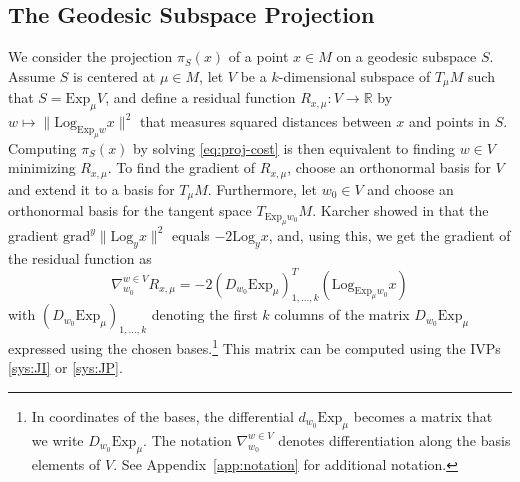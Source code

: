 \documentclass[final]{svjour3}
\newcommand{\RR}{\mathbb{R}}
\newcommand{\grad}{\mathrm{grad}}
\newcommand{\Exp}{\mathrm{Exp}}
\newcommand{\Log}{\mathrm{Log}}
\begin{document}
\subsection{The Geodesic Subspace Projection}
We consider the projection $\pi_S(x)$ of a point $x\in
M$ on a geodesic subspace $S$. Assume $S$ is centered at $\mu\in M$, 
let $V$ be a $k$-dimensional subspace of $T_\mu M$
such that $S=\Exp_\mu V$, and define a residual function $R_{x,\mu}:V\rightarrow\RR$ 
by $w\mapsto\|\Log_{\Exp_\mu w}x\|^2$ that measures squared distances between $x$ and points
in $S$. Computing $\pi_S(x)$ by solving \eqref{eq:proj-cost} is then equivalent to
finding $w\in V$ minimizing $R_{x,\mu}$. To find the gradient of $R_{x,\mu}$, 
choose an orthonormal basis for $V$ 
and extend it to a basis for $T_\mu M$. Furthermore, let
$w_0\in V$ and choose an orthonormal basis for the tangent space $T_{\Exp_\mu w_0}M$. 
Karcher showed in \cite{karcher_riemannian_1977} that the gradient
$\grad^y\|\Log_yx\|^2$ equals $-2\Log_yx$, and, using this, we get the gradient of the
residual function as
\begin{equation}
    \nabla_{w_0}^{w\in V}R_{x,\mu}
        =
    -2(D_{w_0}\Exp_\mu)_{1,\ldots,k}^T
    (\Log_{\Exp_\mu w_0}x)
    \label{eq:proj-proj}
\end{equation}
with $(D_{w_0}\Exp_\mu)_{1,\ldots,k}$ denoting the first $k$ columns of
the matrix $D_{w_0}\Exp_\mu$ expressed using the chosen bases.\footnote{In
coordinates of the bases, the differential $d_{w_0}\Exp_\mu$ becomes a matrix
that we write $D_{w_0}\Exp_\mu$.
The notation $\nabla_{w_0}^{w\in V}$ denotes differentiation along the basis
elements of $V$. See Appendix~\ref{app:notation} for additional notation.}
This matrix can be computed using the IVPs \eqref{sys:JI} or \eqref{sys:JP}.
\end{document}
